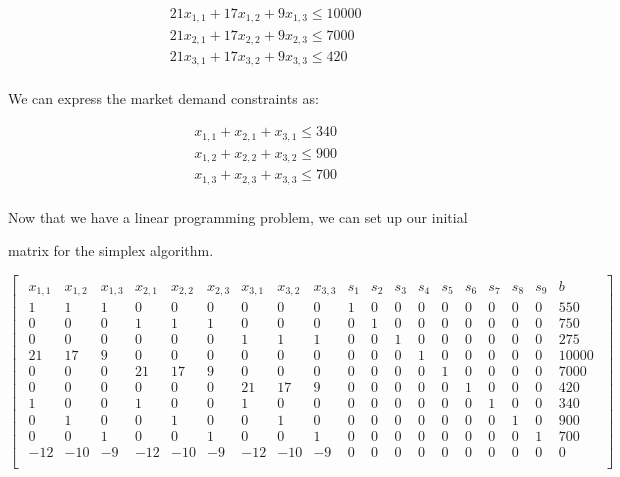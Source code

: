 \documentclass{article}
\begin{document}
\[
\begin{aligned}
    & 21x_{1,1} + 17x_{1,2} + 9x_{1,3} \leq 10000 \\
    & 21x_{2,1} + 17x_{2,2} + 9x_{2,3} \leq 7000 \\
    & 21x_{3,1} + 17x_{3,2} + 9x_{3,3} \leq 420 \\
\end{aligned}
\]

\vspace{\baselineskip}

We can express the market demand constraints as:

\[
\begin{aligned}
    & x_{1,1} + x_{2,1} + x_{3,1} \leq 340 \\
    & x_{1,2} + x_{2,2} + x_{3,2} \leq 900 \\
    & x_{1,3} + x_{2,3} + x_{3,3} \leq 700 \\
\end{aligned}
\]

Now that we have a linear programming problem, we can set up our initial

matrix for the simplex algorithm.

\begin{equation*}\begin{bmatrix}\begin{array}{cccccccccccccccccc|c}x_{1,1} &x_{1,2} &x_{1,3} &x_{2,1} &x_{2,2} &x_{2,3}&x_{3,1} &x_{3,2} &x_{3,3} &s_1 &s_2 &s_3 &s_4 &s_5 &s_6 &s_7 &s_8 &s_9 &b \\ \hline1 & 1 & 1 & 0 & 0 & 0 & 0 & 0 & 0 & 1 & 0 & 0 & 0 & 0 & 0 & 0 & 0 & 0 & 550 \\0 & 0 & 0 & 1 & 1 & 1 & 0 & 0 & 0 & 0 & 1 & 0 & 0 & 0 & 0 & 0 & 0 & 0 & 750 \\0 & 0 & 0 & 0 & 0 & 0 & 1 & 1 & 1 & 0 & 0 & 1 & 0 & 0 & 0 & 0 & 0 & 0 & 275 \\21 & 17 & 9 & 0 & 0 & 0 & 0 & 0 & 0 & 0 & 0 & 0 & 1 & 0 & 0 & 0 & 0 & 0 & 10000 \\0 & 0 & 0 & 21 & 17 & 9 & 0 & 0 & 0 & 0 & 0 & 0 & 0 & 1 & 0 & 0 & 0 & 0 & 7000 \\0 & 0 & 0 & 0 & 0 & 0 & 21 & 17 & 9 & 0 & 0 & 0 & 0 & 0 & 1 & 0 & 0 & 0 & 420 \\1 & 0 & 0 & 1 & 0 & 0 & 1 & 0 & 0 & 0 & 0 & 0 & 0 & 0 & 0 & 1 & 0 & 0 & 340 \\0 & 1 & 0 & 0 & 1 & 0 & 0 & 1 & 0 & 0 & 0 & 0 & 0 & 0 & 0 & 0 & 1 & 0 & 900 \\0 & 0 & 1 & 0 & 0 & 1 & 0 & 0 & 1 & 0 & 0 & 0 & 0 & 0 & 0 & 0 & 0 & 1 & 700 \\ \hline -12 & -10 & -9 & -12 & -10 & -9 & -12 & -10 & -9 & 0 & 0 & 0 & 0 & 0 & 0 & 0 & 0 & 0 & 0 \\\end{array}\end{bmatrix}\begin{array}{c}\\\\\end{array}\end{equation*}
\end{document}
